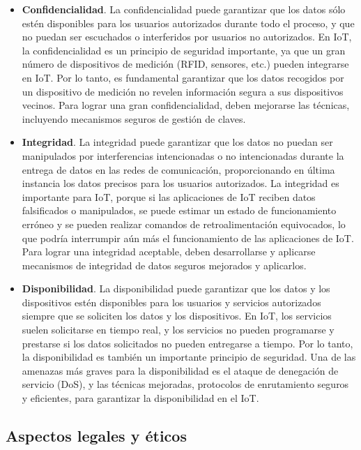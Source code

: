 {\begin{itemize}
    \item  \textbf{Confidencialidad}. La confidencialidad puede garantizar que los datos sólo estén disponibles para los usuarios autorizados durante todo el proceso, y que no puedan ser escuchados o interferidos por usuarios no autorizados. En IoT, la confidencialidad es un principio de seguridad importante, ya que un gran número de dispositivos de medición (RFID, sensores, etc.) pueden integrarse en IoT. Por lo tanto, es fundamental garantizar que los datos recogidos por un dispositivo de medición no revelen información segura a sus dispositivos vecinos. Para lograr una gran confidencialidad, deben mejorarse las técnicas, incluyendo mecanismos seguros de gestión de claves.
    \item  \textbf{Integridad}. La integridad puede garantizar que los datos no puedan ser manipulados por interferencias intencionadas o no intencionadas durante la entrega de datos en las redes de comunicación, proporcionando en última instancia los datos precisos para los usuarios autorizados. La integridad es importante para IoT, porque si las aplicaciones de IoT reciben datos falsificados o manipulados, se puede estimar un estado de funcionamiento erróneo y se pueden realizar comandos de retroalimentación equivocados, lo que podría interrumpir aún más el funcionamiento de las aplicaciones de IoT. Para lograr una integridad aceptable, deben desarrollarse y aplicarse mecanismos de integridad de datos seguros mejorados y aplicarlos.
    \item \textbf{Disponibilidad}. La disponibilidad puede garantizar que los datos y los dispositivos estén disponibles para los usuarios y servicios autorizados siempre que se soliciten los datos y los dispositivos. En IoT, los servicios suelen solicitarse en tiempo real, y los servicios no pueden programarse y prestarse si los datos solicitados no pueden entregarse a tiempo. Por lo tanto, la disponibilidad es también un importante principio de seguridad. Una de las amenazas más graves para la disponibilidad es el ataque de denegación de servicio (DoS), y las técnicas mejoradas, protocolos de enrutamiento seguros y eficientes, para garantizar la disponibilidad en el IoT. \cite{lin2017survey}

\end{itemize}


\subsection{Aspectos legales y éticos}

}
